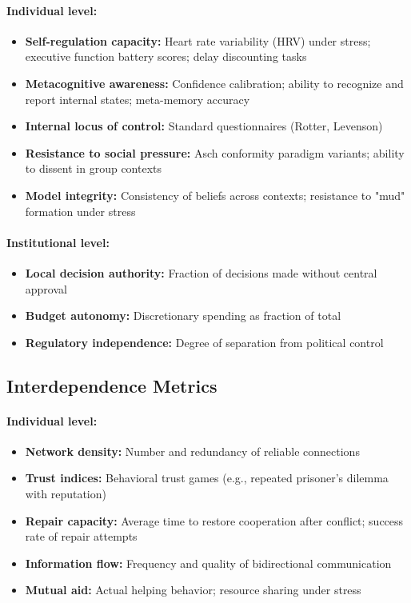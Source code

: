 \documentclass[11pt,a4paper]{article}
\begin{document}
\paragraph{Individual level:}
\begin{itemize}
    \item \textbf{Self-regulation capacity:} Heart rate variability (HRV) under stress; executive function battery scores; delay discounting tasks
    \item \textbf{Metacognitive awareness:} Confidence calibration; ability to recognize and report internal states; meta-memory accuracy
    \item \textbf{Internal locus of control:} Standard questionnaires (Rotter, Levenson)
    \item \textbf{Resistance to social pressure:} Asch conformity paradigm variants; ability to dissent in group contexts
    \item \textbf{Model integrity:} Consistency of beliefs across contexts; resistance to "mud" formation under stress
\end{itemize}

\paragraph{Institutional level:}
\begin{itemize}
    \item \textbf{Local decision authority:} Fraction of decisions made without central approval
    \item \textbf{Budget autonomy:} Discretionary spending as fraction of total
    \item \textbf{Regulatory independence:} Degree of separation from political control
\end{itemize}

\subsection{Interdependence Metrics}

\paragraph{Individual level:}
\begin{itemize}
    \item \textbf{Network density:} Number and redundancy of reliable connections
    \item \textbf{Trust indices:} Behavioral trust games (e.g., repeated prisoner's dilemma with reputation)
    \item \textbf{Repair capacity:} Average time to restore cooperation after conflict; success rate of repair attempts
    \item \textbf{Information flow:} Frequency and quality of bidirectional communication
    \item \textbf{Mutual aid:} Actual helping behavior; resource sharing under stress
\end{itemize}
\end{document}
